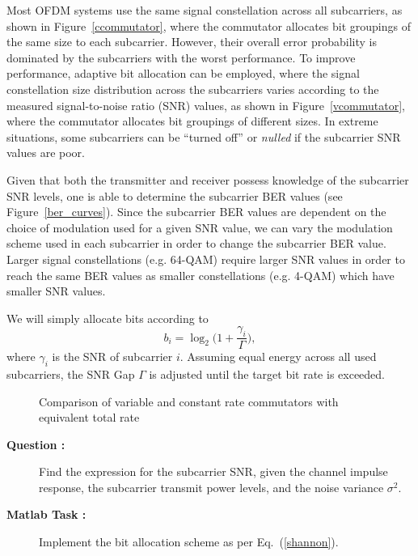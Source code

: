 \documentclass[12pt]{article}
\newcommand{\goodgap}{%
\hspace{\subfigtopskip}%
\hspace{\subfigbottomskip}}
\newcounter{questioncnt}
\newcounter{matlabcnt}
\begin{document}
Most OFDM systems use the same signal constellation across all
subcarriers, as shown in Figure~\ref{ccommutator}, where the
commutator allocates bit groupings of the same size to each
subcarrier. However, their overall error probability is dominated
by the subcarriers with the worst performance. To improve
performance, adaptive bit allocation can be employed, where the
signal constellation size distribution across the subcarriers
varies according to the measured signal-to-noise ratio (SNR)
values, as shown in Figure~\ref{vcommutator}, where the commutator
allocates bit groupings of different sizes. In extreme situations,
some subcarriers can be ``turned off'' or {\it nulled} if the
subcarrier SNR values are poor.

Given that both the transmitter and receiver possess knowledge of
the subcarrier SNR levels, one is able to determine the subcarrier
BER values (see Figure~\ref{ber_curves}). Since the subcarrier BER
values are dependent on the choice of modulation used for a given
SNR value, we can vary the modulation scheme used in each
subcarrier in order to change the subcarrier BER value. Larger
signal constellations (e.g. 64-QAM) require larger SNR values in
order to reach the same BER values as smaller constellations (e.g.
4-QAM) which have smaller SNR values.

We will simply allocate bits according to
\begin{equation}\label{shannon}
b_i=\log_2\Big({1+\frac{\gamma_i}{\Gamma}}\Big),
\end{equation}
where $\gamma_i$ is the SNR of subcarrier $i$. Assuming equal
energy across all used subcarriers, the SNR Gap $\Gamma$ is
adjusted until the target bit rate is exceeded.



\begin{figure}[h]
\begin{center}
\goodgap
{}
\caption{Comparison of variable and constant rate commutators with
equivalent total rate}
\end{center}
\end{figure}


\begin{description}
    \item[{\bf Question :}]
    Find the expression for the subcarrier SNR, given the channel
    impulse response, the subcarrier transmit power levels, and
    the noise variance $\sigma^2$.
\end{description}

\begin{description}
    \item[{\bf Matlab Task :}]
    Implement the bit allocation scheme as per Eq.~(\ref{shannon}).
\end{description}
\end{document}
